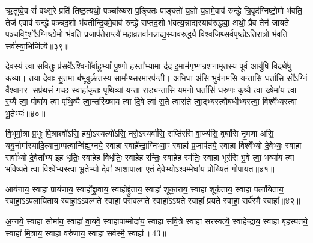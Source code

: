 ऋ॒तुष्वे॒व सं॑ वथ्स॒रे प्रति॑ तिष्ठ॒त्यथो॒ पञ्चा᳚ख्षरा प॒ङ्क्तिः पाङ्क्तो॑ य॒ज्ञो य॒ज्ञमे॒वाव॑ रुन्द्धे त्रि॒वृद॑ग्निष्टो॒मो भ॑वति॒ तेज॑ ए॒वाव॑ रुन्द्धे पञ्चद॒शो भ॑वतीन्द्रि॒यमे॒वाव॑ रुन्द्धे सप्तद॒शो भ॑वत्य॒न्नाद्य॒स्याव॑रुद्ध्या॒ अथो॒ प्रैव तेन॑ जायते पञ्चवि॒ꣳ॒शो᳚\-ऽग्निष्टो॒मो भ॑वति प्र॒जाप॑ते॒राप्त्यै॑ महाव्र॒तवा॑न॒न्नाद्य॒स्याव॑रुद्ध्यै विश्व॒जिथ्सर्व॑पृष्ठो\-ऽतिरा॒त्रो भ॑वति॒ सर्व॑स्या॒भिजि॑त्यै॥३९॥

{\anuvakamend[{ते व्याव॑र्तन्त प्रवदि॒ता स्या॒मिति॒ स ए॒तम्प़॑ञ्चरा॒त्रमा सं॑ वथ्स॒रो॑\-ऽभिजि॑त्यै॥10॥}]}

दे॒वस्य॑ त्वा सवि॒तुः प्र॑स॒वे᳚\-ऽश्विनो᳚र्बा॒हु\-भ्यां᳚ पू॒ष्णो हस्ता᳚भ्या॒मा द॑द इ॒माम॑गृभ्णन्रश॒नामृ॒तस्य॒ पूर्व॒ आयु॑षि वि॒दथे॑षु क॒व्या। तया॑ दे॒वाः सु॒तमा ब॑भूवुर्\mbox{}ऋ॒तस्य॒ साम᳚न्थ्स॒रमा॒रप॑न्ती। अ॒भि॒धा अ॑सि॒ भुव॑नमसि य॒न्तासि॑ ध॒र्तासि॒ सो᳚\-ऽग्निं वै᳚श्वान॒र सप्र॑थसं गच्छ॒ स्वाहा॑कृतः पृथि॒व्यां य॒न्ता राड्य॒न्तासि॒ यम॑नो ध॒र्तासि॑ ध॒रुणः॑ कृ॒ष्यै त्वा॒ ख्षेमा॑य त्वा र॒य्यै त्वा॒ पोषा॑य त्वा पृथि॒व्यै त्वा॒न्तरि॑ख्षाय त्वा दि॒वे त्वा॑ स॒ते त्वास॑ते त्वा॒द्भ्यस्त्वौष॑धीभ्यस्त्वा॒ विश्वे᳚भ्यस्त्वा भू॒तेभ्यः॑॥४०॥

{\anuvakamend[{ध॒रुणः॒ प़ञ्च॑विशतिश्च॥11॥}]}

वि॒भूर्मा॒त्रा प्र॒भूः पि॒त्राश्वो॑\-ऽसि॒ हयो॒\-ऽस्यत्यो॑\-ऽसि॒ नरो॒\-ऽस्यर्वा॑सि॒ सप्ति॑रसि वा॒ज्य॑सि॒ वृषा॑सि नृ॒मणा॑ असि॒ ययु॒र्नामा᳚स्यादि॒त्याना॒म्पत्वान्वि॑ह्य॒ग्नये॒ स्वाहा॒ स्वाहे᳚न्द्रा॒ग्निभ्या॒ꣳ॒ स्वाहा᳚ प्र॒जाप॑तये॒ स्वाहा॒ विश्वे᳚भ्यो दे॒वेभ्यः॒ स्वाहा॒ सर्वा᳚भ्यो दे॒वेता᳚भ्य इ॒ह धृतिः॒ स्वाहे॒ह विधृ॑तिः॒ स्वाहे॒ह रन्तिः॒ स्वाहे॒ह रम॑तिः॒ स्वाहा॒ भूर॑सि भु॒वे त्वा॒ भव्या॑य त्वा भविष्य॒ते त्वा॒ विश्वे᳚भ्यस्त्वा भू॒तेभ्यो॒ देवा॑ आशापाला ए॒तं दे॒वेभ्यो\-ऽश्व॒म्मेधा॑य॒ प्रोख्षि॑तं गोपायत॥४१॥

{\anuvakamend[{रन्तिः॒ स्वाहा॒ द्वाविꣳ॑शतिश्च॥12॥}]}

आय॑नाय॒ स्वाहा॒ प्राय॑णाय॒ स्वाहो᳚द्द्रा॒वाय॒ स्वाहोद्द्रु॑ताय॒ स्वाहा॑ शूका॒राय॒ स्वाहा॒ शूकृ॑ताय॒ स्वाहा॒ पला॑यिताय॒ स्वाहा॒\-ऽ\-ऽपला॑यिताय॒ स्वाहा॒\-ऽ\-ऽवल्ग॑ते॒ स्वाहा॑ परा॒वल्ग॑ते॒ स्वाहा॑\-ऽ\-ऽय॒ते स्वाहा᳚ प्रय॒ते स्वाहा॒ सर्व॑स्मै॒ स्वाहा᳚॥४२॥

{\anuvakamend[{आय॑ना॒योत्त॑रमा॒पला॑यिताय॒ षड्विꣳ॑शतिः॥13॥}]}

अ॒ग्नये॒ स्वाहा॒ सोमा॑य॒ स्वाहा॑ वा॒यवे॒ स्वाहा॒पाम्मोदा॑य॒ स्वाहा॑ सवि॒त्रे स्वाहा॒ सर॑स्वत्यै॒ स्वाहेन्द्रा॑य॒ स्वाहा॒ बृह॒स्पत॑ये॒ स्वाहा॑ मि॒त्राय॒ स्वाहा॒ वरु॑णाय॒ स्वाहा॒ सर्व॑स्मै॒ स्वाहा᳚॥ 43॥

